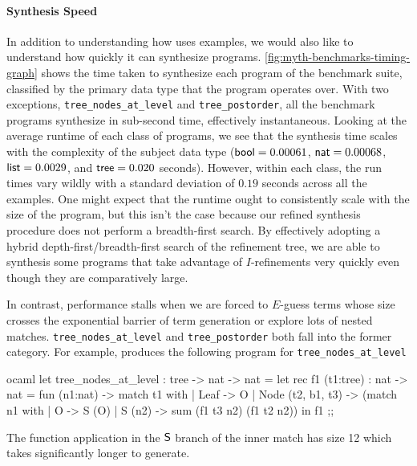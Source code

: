 \paragraph{Synthesis Speed}



In addition to understanding how \myth{} uses examples, we would also like to understand how quickly it can synthesize programs.
\autoref{fig:myth-benchmarks-timing-graph} shows the time taken to synthesize each program of the benchmark suite, classified by the primary data type that the program operates over.
With two exceptions, \texttt{tree\_nodes\_at\_level} and \texttt{tree\_postorder}, all the benchmark programs synthesize in sub-second time, effectively instantaneous.
Looking at the average runtime of each class of programs, we see that the synthesis time scales with the complexity of the subject data type ($\mathsf{bool} = 0.00061$, $\mathsf{nat} = 0.00068$, $\mathsf{list} = 0.0029$, and $\mathsf{tree} = 0.020$ seconds).
However, within each class, the run times vary wildly with a standard deviation of $0.19$ seconds across all the examples.
One might expect that the runtime ought to consistently scale with the size of the program, but this isn't the case because our refined synthesis procedure does not perform a breadth-first search.
By effectively adopting a hybrid depth-first/breadth-first search of the refinement tree, we are able to synthesis some programs that take advantage of $I$-refinements very quickly even though they are comparatively large.

In contrast, performance stalls when we are forced to $E$-guess terms whose size crosses the exponential barrier of term generation or explore lots of nested matches.
\texttt{tree\_nodes\_at\_level} and \texttt{tree\_postorder} both fall into the former category.
For example, \myth{} produces the following program for \texttt{tree\_nodes\_at\_level}

\begin{center}
  \begin{cminted}{ocaml}
let tree_nodes_at_level : tree -> nat -> nat =
 let rec f1 (t1:tree) : nat -> nat =
   fun (n1:nat) ->
     match t1 with
       | Leaf -> O
       | Node (t2, b1, t3) -> (match n1 with
                                 | O -> S (O)
                                 | S (n2) -> sum (f1 t3 n2) (f1 t2 n2))
 in
   f1
;;
  \end{cminted}
\end{center}

The function application in the $\mathsf{S}$ branch of the inner match has size 12 which takes significantly longer to generate.

